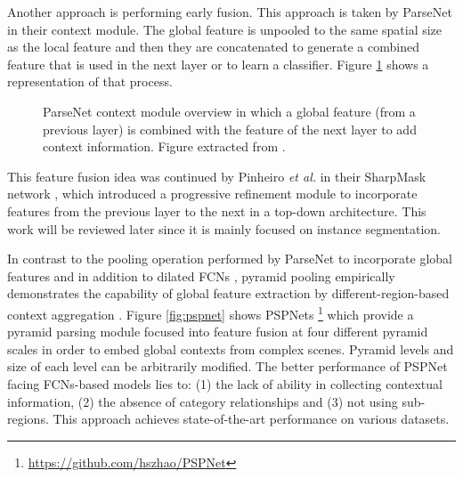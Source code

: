 Another approach is performing early fusion. This approach is taken by ParseNet\cite{Liu2015} in their context module. The global feature is unpooled to the same spatial size as the local feature and then they are concatenated to generate a combined feature that is used in the next layer or to learn a classifier. Figure \ref{fig:parsenet-module} shows a representation of that process.

\begin{figure}[!hbt]
	\centering
	\caption{ParseNet context module overview in which a global feature (from a previous layer) is combined with the feature of the next layer to add context information. Figure extracted from \cite{Liu2015}.}
	\label{fig:parsenet-module}
\end{figure}

This feature fusion idea was continued by Pinheiro \emph{et al.} in their SharpMask network \cite{Pinheiro2016}, which introduced a progressive refinement module to incorporate features from the previous layer to the next in a top-down architecture. This work will be reviewed later since it is mainly focused on instance segmentation.

In contrast to the pooling operation performed by ParseNet to incorporate global features and in addition to dilated \acsp{FCN} \cite{Chen2014a}\cite{Yu2015}, pyramid pooling empirically demonstrates the capability of global feature extraction by different-region-based context aggregation \cite{Zhao2016}. Figure \ref{fig:pspnet} shows \acfp{PSPNet} \footnote{\url{https://github.com/hszhao/PSPNet}} which provide a pyramid parsing module focused into feature fusion at four different pyramid scales in order to embed global contexts from complex scenes. Pyramid levels and size of each level can be arbitrarily modified. The better performance of \acs{PSPNet} facing \acsp{FCN}-based models lies to: (1) the lack of ability in collecting contextual information, (2) the absence of category relationships and (3) not using sub-regions. This approach achieves state-of-the-art performance on various datasets. 

\begin{figure*}[!hbt]
	\centering
	\caption{\acs{PSPNet} architecture. Initial feature maps (b) are extracted from input images (a) by using a pretrained ResNet \cite{He2016} alongside dilated network strategy. Pyramid pooling module (c) covers from the whole, half of to small regions of the image. Finally, initial feature map is concatenated with pooling module output and applying a convolution layer final predicted maps (d) are generated. Figure extracted from \cite{Zhao2016}.}
	\label{fig:pspnet}
\end{figure*}

